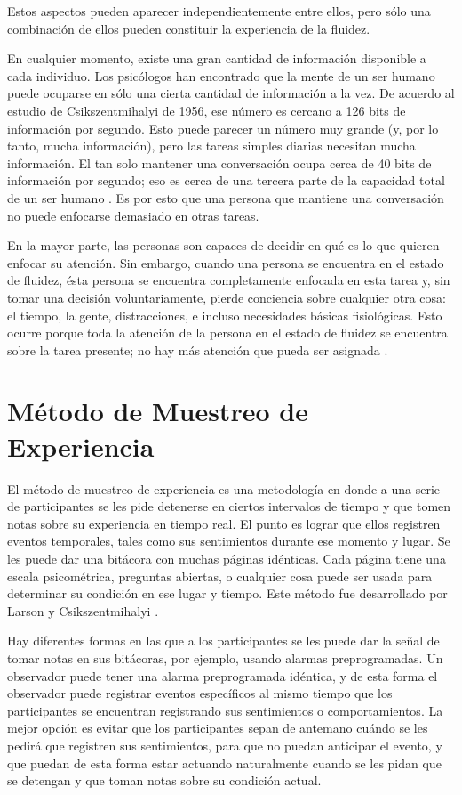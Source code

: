Estos aspectos pueden aparecer independientemente entre ellos, pero sólo una combinación de ellos pueden constituir la experiencia de la fluidez.

En cualquier momento, existe una gran cantidad de información disponible a cada individuo. Los psicólogos han encontrado que la mente de un ser humano puede ocuparse en sólo una cierta cantidad de información a la vez. De acuerdo al estudio de Csikszentmihalyi de 1956, ese número es cercano a 126 bits de información por segundo. Esto puede parecer un número muy grande (y, por lo tanto, mucha información), pero las tareas simples diarias necesitan mucha información. El tan solo mantener una conversación ocupa cerca de 40 bits de información por segundo; eso es cerca de una tercera parte de la capacidad total de un ser humano \cite{csikszentmihalyi1992optimal}. Es por esto que una persona que mantiene una conversación no puede enfocarse demasiado en otras tareas.

En la mayor parte, las personas son capaces de decidir en qué es lo que quieren enfocar su atención. Sin embargo, cuando una persona se encuentra en el estado de fluidez, ésta persona se encuentra completamente enfocada en esta tarea y, sin tomar una decisión voluntariamente, pierde conciencia sobre cualquier otra cosa: el tiempo, la gente, distracciones, e incluso necesidades básicas fisiológicas. Esto ocurre porque toda la atención de la persona en el estado de fluidez se encuentra sobre la tarea presente; no hay más atención que pueda ser asignada \cite{csikszentmihalyi1992optimal}.

\section{Método de Muestreo de Experiencia}
\label{esm}

El método de muestreo de experiencia es una metodología en donde a una serie de participantes se les pide detenerse en ciertos intervalos de tiempo y que tomen notas sobre su experiencia en tiempo real. El punto es lograr que ellos registren eventos temporales, tales como sus sentimientos durante ese momento y lugar. Se les puede dar una bitácora con muchas páginas idénticas. Cada página tiene una escala psicométrica, preguntas abiertas, o cualquier cosa puede ser usada para determinar su condición en ese lugar y tiempo. Este método fue desarrollado por Larson y Csikszentmihalyi \cite{larson1983experience}.

Hay diferentes formas en las que a los participantes se les puede dar la señal de tomar notas en sus bitácoras, por ejemplo, usando alarmas preprogramadas. Un observador puede tener una alarma preprogramada idéntica, y de esta forma el observador puede registrar eventos específicos al mismo tiempo que los participantes se encuentran registrando sus sentimientos o comportamientos. La mejor opción es evitar que los participantes sepan de antemano cuándo se les pedirá que registren sus sentimientos, para que no puedan anticipar el evento, y que puedan de esta forma estar actuando naturalmente cuando se les pidan que se detengan y que toman notas sobre su condición actual.

